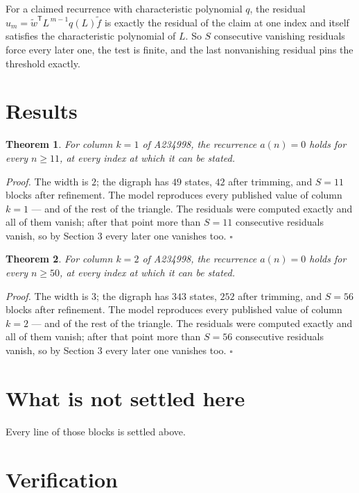 \documentclass[11pt]{article}
\newtheorem{theorem}{Theorem}
\theoremstyle{definition}
\begin{document}
For a claimed recurrence with characteristic polynomial $q$, the residual $u_m = \tilde w^{\mathsf T}L^{\,m-1}q(L)\tilde f$ is exactly the residual of the claim at one index and itself satisfies the characteristic polynomial of $L$. So $S$ consecutive vanishing residuals force every later one, the test is finite, and the last nonvanishing residual pins the threshold exactly.

\section{Results}

\begin{theorem} For column $k = 1$ of A234998, the recurrence $a(n) = 0$ holds for every $n \ge 11$, at every index at which it can be stated.\end{theorem}

{\itshape Proof.} The width is $2$; the digraph has $49$ states, $42$ after trimming, and $S = 11$ blocks after refinement. The model reproduces every published value of column $k = 1$ --- and of the rest of the triangle. The residuals were computed exactly and all of them vanish; after that point more than $S = 11$ consecutive residuals vanish, so by Section 3 every later one vanishes too. $\square$

\begin{theorem} For column $k = 2$ of A234998, the recurrence $a(n) = 0$ holds for every $n \ge 50$, at every index at which it can be stated.\end{theorem}

{\itshape Proof.} The width is $3$; the digraph has $343$ states, $252$ after trimming, and $S = 56$ blocks after refinement. The model reproduces every published value of column $k = 2$ --- and of the rest of the triangle. The residuals were computed exactly and all of them vanish; after that point more than $S = 56$ consecutive residuals vanish, so by Section 3 every later one vanishes too. $\square$

\section{What is not settled here}

Every line of those blocks is settled above.

\section{Verification}
\end{document}
